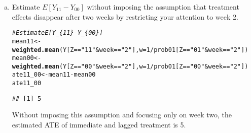 \documentclass[11pt,notitlepage]{article}\usepackage[]{graphicx}\usepackage[]{color}
\makeatletter
\newcommand{\hlnum}[1]{\textcolor[rgb]{0.686,0.059,0.569}{#1}}%
\newcommand{\hlstr}[1]{\textcolor[rgb]{0.192,0.494,0.8}{#1}}%
\newcommand{\hlcom}[1]{\textcolor[rgb]{0.678,0.584,0.686}{\textit{#1}}}%
\newcommand{\hlopt}[1]{\textcolor[rgb]{0,0,0}{#1}}%
\newcommand{\hlstd}[1]{\textcolor[rgb]{0.345,0.345,0.345}{#1}}%
\newcommand{\hlkwb}[1]{\textcolor[rgb]{0.69,0.353,0.396}{#1}}%
\newcommand{\hlkwc}[1]{\textcolor[rgb]{0.333,0.667,0.333}{#1}}%
\newcommand{\hlkwd}[1]{\textcolor[rgb]{0.737,0.353,0.396}{\textbf{#1}}}%
\newenvironment{kframe}{%
 \def\at@end@of@kframe{}%
 \ifinner\ifhmode%
  \def\at@end@of@kframe{\end{minipage}}%
  \begin{minipage}{\columnwidth}%
 \fi\fi%
 \def\FrameCommand##1{\hskip\@totalleftmargin \hskip-\fboxsep
 \colorbox{shadecolor}{##1}\hskip-\fboxsep
     \hskip-\linewidth \hskip-\@totalleftmargin \hskip\columnwidth}%
 \MakeFramed {\advance\hsize-\width
   \@totalleftmargin\z@ \linewidth\hsize
   \@setminipage}}%
 {\par\unskip\endMakeFramed%
 \at@end@of@kframe}
\newenvironment{knitrout}{}{} %
\makeatother
\begin{document}
\begin{enumerate}[a)]
\item Estimate $E[Y_{11} - Y_{00}]$ without imposing the assumption that treatment effects disappear after two weeks by restricting your attention to week 2.

\begin{knitrout}
\color{fgcolor}\begin{kframe}
\begin{alltt}
\hlcom{# Estimate E[Y_\{11\}-Y_\{00\}]}
\hlstd{mean11} \hlkwb{<-} \hlkwd{weighted.mean}\hlstd{(Y[Z}\hlopt{==}\hlstr{"11"} \hlopt{&} \hlstd{week}\hlopt{==}\hlstr{"2"}\hlstd{],} \hlkwc{w}\hlstd{=}\hlnum{1}\hlopt{/}\hlstd{prob01[Z}\hlopt{==}\hlstr{"01"} \hlopt{&} \hlstd{week}\hlopt{==}\hlstr{"2"}\hlstd{])}
\hlstd{mean00} \hlkwb{<-} \hlkwd{weighted.mean}\hlstd{(Y[Z}\hlopt{==}\hlstr{"00"} \hlopt{&} \hlstd{week}\hlopt{==}\hlstr{"2"}\hlstd{],} \hlkwc{w}\hlstd{=}\hlnum{1}\hlopt{/}\hlstd{prob01[Z}\hlopt{==}\hlstr{"00"} \hlopt{&} \hlstd{week}\hlopt{==}\hlstr{"2"}\hlstd{])}
\hlstd{ate11_00} \hlkwb{<-} \hlstd{mean11} \hlopt{-} \hlstd{mean00}
\hlstd{ate11_00}
\end{alltt}
\begin{verbatim}
## [1] 5
\end{verbatim}
\end{kframe}
\end{knitrout}

Without imposing this assumption and focusing only on week two, the estimated ATE of immediate and lagged treatment is 5.
\end{enumerate}
\end{document}
